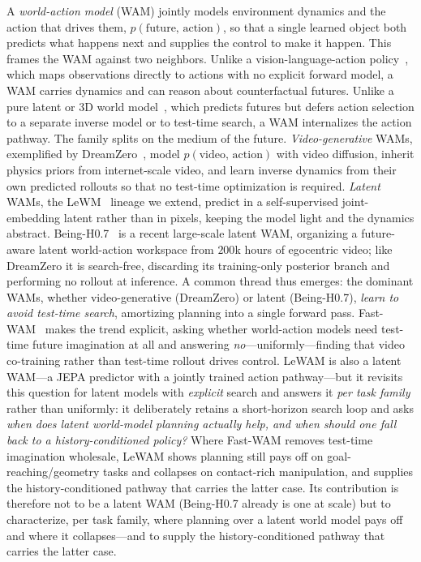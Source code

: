 A \emph{world-action model} (WAM) jointly models environment dynamics and the action that drives them, $p(\text{future},\,\text{action})$, so that a single learned object both predicts what happens next and supplies the control to make it happen. This frames the WAM against two neighbors. Unlike a vision-language-action policy~\cite{openvla,rt2}, which maps observations directly to actions with no explicit forward model, a WAM carries dynamics and can reason about counterfactual futures. Unlike a pure latent or 3D world model~\cite{dinowm,vjepa2}, which predicts futures but defers action selection to a separate inverse model or to test-time search, a WAM internalizes the action pathway. The family splits on the medium of the future. \emph{Video-generative} WAMs, exemplified by DreamZero~\cite{dreamzero}, model $p(\text{video},\,\text{action})$ with video diffusion, inherit physics priors from internet-scale video, and learn inverse dynamics from their own predicted rollouts so that no test-time optimization is required. \emph{Latent} WAMs, the LeWM~\cite{lewm} lineage we extend, predict in a self-supervised joint-embedding latent rather than in pixels, keeping the model light and the dynamics abstract. Being-H0.7~\cite{beingh07} is a recent large-scale latent WAM, organizing a future-aware latent world-action workspace from $200$k hours of egocentric video; like DreamZero it is search-free, discarding its training-only posterior branch and performing no rollout at inference. A common thread thus emerges: the dominant WAMs, whether video-generative (DreamZero) or latent (Being-H0.7), \emph{learn to avoid test-time search}, amortizing planning into a single forward pass. Fast-WAM~\cite{fastwam} makes the trend explicit, asking whether world-action models need test-time future imagination at all and answering \emph{no}---uniformly---finding that video co-training rather than test-time rollout drives control. LeWAM is also a latent WAM---a JEPA predictor with a jointly trained action pathway---but it revisits this question for latent models with \emph{explicit} search and answers it \emph{per task family} rather than uniformly: it deliberately retains a short-horizon search loop and asks \emph{when does latent world-model planning actually help, and when should one fall back to a history-conditioned policy?} Where Fast-WAM removes test-time imagination wholesale, LeWAM shows planning still pays off on goal-reaching/geometry tasks and collapses on contact-rich manipulation, and supplies the history-conditioned pathway that carries the latter case. Its contribution is therefore not to be a latent WAM (Being-H0.7 already is one at scale) but to characterize, per task family, where planning over a latent world model pays off and where it collapses---and to supply the history-conditioned pathway that carries the latter case.

